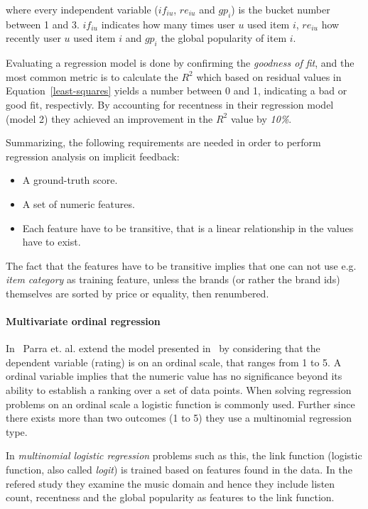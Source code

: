 where every independent variable ($if_{iu}$, $re_{iu}$ and $gp_{i}$) is the
bucket number between 1 and 3. $if_{iu}$ indicates how many times user $u$ used
item $i$, $re_{iu}$ how recently user $u$ used item $i$ and $gp_{i}$ the global
popularity of item $i$.

Evaluating a regression model is done by confirming the \textit{goodness of
fit}, and the most common metric is to calculate the $R^2$ which based on
residual values in Equation~\ref{least-squares} yields a number between 0 and
1, indicating a bad or good fit, respectivly. By accounting for recentness in
their regression model (model 2) they achieved an improvement in the $R^2$
value by \textit{10\%}.

Summarizing, the following requirements are needed in order to perform
regression analysis on implicit feedback:

\begin{itemize}
  \item A ground-truth score.
  \item A set of numeric features.
  \item Each feature have to be transitive, that is a linear relationship in
  the values have to exist.
\end{itemize}

The fact that the features have to be transitive implies that one can not use
e.g. \textit{item category} as training feature, unless the brands (or rather
the brand ids) themselves are sorted by price or equality, then renumbered.

\paragraph{Multivariate ordinal regression}
In~\cite{parra2011implicit} Parra et. al. extend the model presented
in~\cite{parra2011walk} by considering that the dependent variable (rating) is
on an ordinal scale, that ranges from 1 to 5. A ordinal variable implies that
the numeric value has no significance beyond its ability to establish a ranking
over a set of data points. When solving regression problems on an ordinal scale
a logistic function is commonly used. Further since there exists more than two
outcomes (1 to 5) they use a multinomial regression type.

In \textit{multinomial logistic regression} problems such as this, the link
function (logistic function, also called \textit{logit}) is trained based on
features found in the data. In the refered study they examine the music domain
and hence they include listen count, recentness and the global popularity as
features to the link function.

